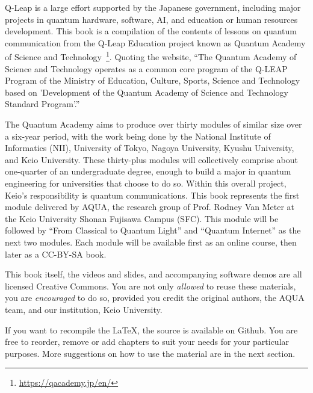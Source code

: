 
\begin{preface}
Q-Leap is a large effort supported by the Japanese government, including major projects in quantum hardware, software, AI, and education or human resources development.  This book is a compilation of the contents of lessons on quantum communication from the Q-Leap Education project known as Quantum Academy of Science and Technology~\footnote{\url{https://qacademy.jp/en/}}. Quoting the website, ``The Quantum Academy of Science and Technology operates as a common core program of the Q-LEAP Program of the Ministry of Education, Culture, Sports, Science and Technology based on 'Development of the Quantum Academy of Science and Technology Standard Program'.''

The Quantum Academy aims to produce over thirty modules of similar size over a six-year period, with the work being done by the National Institute of Informatics (NII), University of Tokyo, Nagoya University, Kyushu University, and Keio University. These thirty-plus modules will collectively comprise about one-quarter of an undergraduate degree, enough to build a major in quantum engineering for universities that choose to do so. Within this overall project, Keio's responsibility is quantum communications.  This book represents the first module delivered by AQUA, the research group of Prof. Rodney Van Meter at the Keio University Shonan Fujisawa Campus (SFC).  This module will be followed by ``From Classical to Quantum Light'' and ``Quantum Internet'' as the next two modules.  Each module will be available first as an online course, then later as a CC-BY-SA book.

This book itself, the videos and slides, and accompanying software demos are all licensed Creative Commons. You are not only \emph{allowed} to reuse these materials, you are \emph{encouraged} to do so, provided you credit the original authors, the AQUA team, and our institution, Keio University.

If you want to recompile the \LaTeX, the source is available on Github. You are free to reorder, remove or add chapters to suit your needs for your particular purposes.  More suggestions on how to use the material are in the next section.

\author{Michal and Rodney}
\date{sometime in 2023}
\end{preface}

